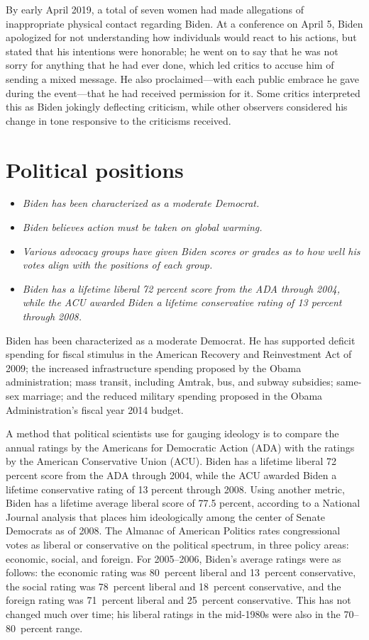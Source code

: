 By early April 2019, a total of seven women had made allegations of
inappropriate physical contact regarding Biden. At a conference on April
5, Biden apologized for not understanding how individuals would react to
his actions, but stated that his intentions were honorable; he went on
to say that he was not sorry for anything that he had ever done, which
led critics to accuse him of sending a mixed message. He also
proclaimed---with each public embrace he gave during the event---that he
had received permission for it. Some critics interpreted this as Biden
jokingly deflecting criticism, while other observers considered his
change in tone responsive to the criticisms received.

\section{Political positions}\label{political-positions}

\begin{itemize}
\item
  \emph{Biden has been characterized as a moderate Democrat.}
\item
  \emph{Biden believes action must be taken on global warming.}
\item
  \emph{Various advocacy groups have given Biden scores or grades as to
  how well his votes align with the positions of each group.}
\item
  \emph{Biden has a lifetime liberal 72 percent score from the ADA
  through 2004, while the ACU awarded Biden a lifetime conservative
  rating of 13 percent through 2008.}
\end{itemize}

Biden has been characterized as a moderate Democrat. He has supported
deficit spending for fiscal stimulus in the American Recovery and
Reinvestment Act of 2009; the increased infrastructure spending proposed
by the Obama administration; mass transit, including Amtrak, bus, and
subway subsidies; same-sex marriage; and the reduced military spending
proposed in the Obama Administration's fiscal year 2014 budget.

A method that political scientists use for gauging ideology is to
compare the annual ratings by the Americans for Democratic Action (ADA)
with the ratings by the American Conservative Union (ACU). Biden has a
lifetime liberal 72 percent score from the ADA through 2004, while the
ACU awarded Biden a lifetime conservative rating of 13 percent through
2008. Using another metric, Biden has a lifetime average liberal score
of 77.5 percent, according to a National Journal analysis that places
him ideologically among the center of Senate Democrats as of 2008. The
Almanac of American Politics rates congressional votes as liberal or
conservative on the political spectrum, in three policy areas: economic,
social, and foreign. For 2005--2006, Biden's average ratings were as
follows: the economic rating was 80~percent liberal and 13~percent
conservative, the social rating was 78~percent liberal and 18~percent
conservative, and the foreign rating was 71~percent liberal and
25~percent conservative. This has not changed much over time; his
liberal ratings in the mid-1980s were also in the 70--80~percent range.

